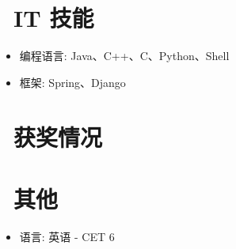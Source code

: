 \documentclass{resume}
\begin{document}

\section{\faCogs\ IT 技能}
\begin{itemize}[parsep=0.5ex]
  \item 编程语言: Java、C++、C、Python、Shell
  \item 框架: Spring、Django
\end{itemize}

\section{\faHeartO\ 获奖情况}

\section{\faInfo\ 其他}
\begin{itemize}[parsep=0.5ex]
  \item 语言: 英语 - CET 6
\end{itemize}

%
%
\end{document}
